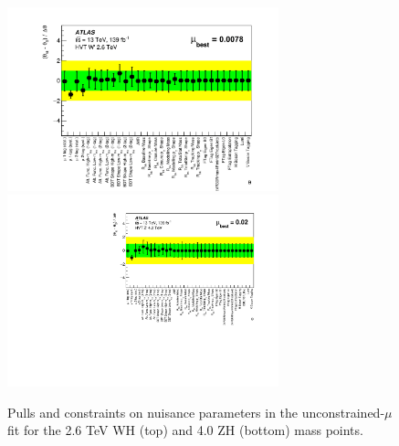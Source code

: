 \begin{figure}[htbp!]
    \begin{center}
        \includegraphics[width=0.7\textwidth]{Pulls_UnconditionalMu_WH_2600.png} \\
        \includegraphics[width=0.7\textwidth]{Pulls_UnconditionalMu_ZH_4000.pdf}
    \end{center}
    \caption{
        Pulls and constraints on nuisance parameters in the unconstrained-$\mu$ fit for the 2.6 TeV WH (top) and 4.0 ZH (bottom) mass points.
    }
    \label{fig:pull_plots}
\end{figure}


